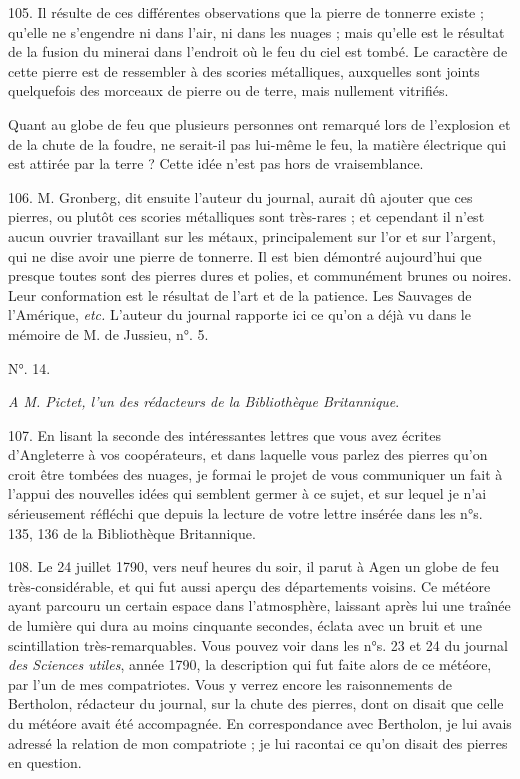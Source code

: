 \documentclass[a4paper, 11pt, oneside, polutonikogreek, french]{article}
\begin{document}
105. Il résulte de ces différentes observations que la pierre de tonnerre existe ; qu'elle ne s'engendre ni dans l'air, ni dans les nuages ; mais qu'elle est le résultat de la fusion du minerai dans l'endroit où le feu du ciel est tombé. Le caractère de cette pierre est de ressembler à des scories métalliques, auxquelles sont joints quelquefois des morceaux de pierre ou de terre, mais nullement vitrifiés.

Quant au globe de feu que plusieurs personnes ont remarqué lors de l'explosion et de la chute de la foudre, ne serait-il pas lui-même le feu, la matière électrique qui est attirée par la terre ? Cette idée n'est pas hors de vraisemblance.

106. M. Gronberg, dit ensuite l'auteur du journal, aurait dû ajouter que ces pierres, ou plutôt ces scories métalliques sont très-rares ; et cependant il n'est aucun ouvrier travaillant sur les métaux, principalement sur l'or et sur l'argent, qui ne dise avoir une pierre de tonnerre. Il est bien démontré aujourd'hui que presque toutes sont des pierres dures et polies, et communément brunes ou noires. Leur conformation est le résultat de l'art et de la patience. Les Sauvages de l'Amérique, \emph{etc.} L'auteur du journal rapporte ici ce qu'on a déjà vu dans le mémoire de M. de Jussieu, n°. 5.

\begin{center}
N°. 14.
\end{center}

\emph{A M. Pictet, l'un des rédacteurs de la Bibliothèque Britannique}.

107. En lisant la seconde des intéressantes lettres que vous avez écrites d'Angleterre à vos coopérateurs, et dans laquelle vous parlez des pierres qu'on croit être tombées des nuages, je formai le projet de vous communiquer un fait à l'appui des nouvelles idées qui semblent germer à ce sujet, et sur lequel je n'ai sérieusement réfléchi que depuis la lecture de votre lettre insérée dans les n°s. 135, 136 de la Bibliothèque Britannique.

108. Le 24 juillet 1790, vers neuf heures du soir, il parut à Agen un globe de feu très-considérable, et qui fut aussi aperçu des départements voisins. Ce météore ayant parcouru un certain espace dans l'atmosphère, laissant après lui une traînée de lumière qui dura au moins cinquante secondes, éclata avec un bruit et une scintillation très-remarquables. Vous pouvez voir dans les n°s. 23 et 24 du journal \emph{des Sciences utiles}, année 1790, la description qui fut faite alors de ce météore, par l'un de mes compatriotes. Vous y verrez encore les raisonnements de Bertholon, rédacteur du journal, sur la chute des pierres, dont on disait que celle du météore avait été accompagnée. En correspondance avec Bertholon, je lui avais adressé la relation de mon compatriote ; je lui racontai ce qu'on disait des pierres en question.
\end{document}
